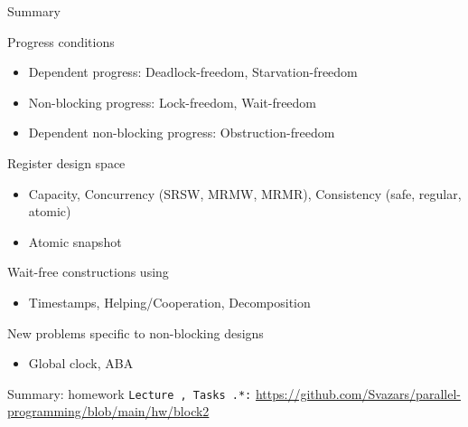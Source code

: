 \begin{frame}{Summary}

Progress conditions
\begin{itemize}
  \item Dependent progress: Deadlock-freedom, Starvation-freedom
  \item Non-blocking progress: Lock-freedom, Wait-freedom
  \item Dependent non-blocking progress: Obstruction-freedom
\end{itemize}

Register design space
\begin{itemize}
  \item Capacity, Concurrency (SRSW, MRMW, MRMR), Consistency (safe, regular, atomic)
  \item Atomic snapshot
\end{itemize}

Wait-free constructions using
\begin{itemize}
  \item Timestamps, Helping/Cooperation, Decomposition 
\end{itemize}

New problems specific to non-blocking designs
\begin{itemize}
  \item Global clock, ABA
\end{itemize}


% 
% 
% 
% 
% 
% 
% 
% 

\end{frame}

\begin{frame}{Summary: homework}
  \texttt{Lecture \thisLectureNum, Tasks \thisLectureNum.*:} {\tiny\url{https://github.com/Svazars/parallel-programming/blob/main/hw/block2}}
\end{frame}


